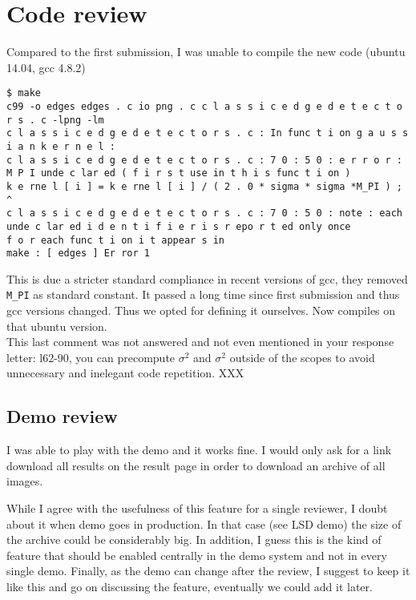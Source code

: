 \documentclass[a4paper,10pt]{report}
\begin{document}
\section{Code review}

\que Compared to the first submission, I was unable to compile the new code (ubuntu 14.04, gcc 4.8.2)
\begin{verbatim}
$ make
c99 -o edges edges . c io png . c c l a s s i c e d g e d e t e c t o r s . c -lpng -lm
c l a s s i c e d g e d e t e c t o r s . c : In func t i on g a u s s i a n k e r n e l :
c l a s s i c e d g e d e t e c t o r s . c : 7 0 : 5 0 : e r r o r : M P I unde c lar ed ( f i r s t use in t h i s func t i on )
k e rne l [ i ] = k e rne l [ i ] / ( 2 . 0 * sigma * sigma *M_PI ) ;
^
c l a s s i c e d g e d e t e c t o r s . c : 7 0 : 5 0 : note : each unde c lar ed i d e n t i f i e r i s r epo r t ed only once
f o r each func t i on i t appear s in
make : [ edges ] Er ror 1
\end{verbatim}

\ans This is due a stricter standard compliance in recent versions of gcc, they removed \verb+M_PI+ as standard constant. It passed a long time since first submission and thus gcc versions changed. Thus we opted for defining it ourselves. Now compiles on that ubuntu version.\\

\que This last comment was not answered and not even mentioned in your response letter:
l62-90, you can precompute $\sigma^2$ and $\sigma^2$ outside of the scopes to avoid unnecessary and inelegant code
repetition.
\ans  XXX\\

\subsection{ Demo review}
\que I was able to play with the demo and it works fine. I would only ask for a link download all results on the
result page in order to download an archive of all images.

\ans While I agree with the usefulness of this feature for a single reviewer, I doubt about it when demo goes in production. In that case (see LSD demo) the size of the archive could be considerably big. In addition, I guess this is the kind of feature that should be enabled centrally in the demo system and not in every single demo. Finally, as the demo can change after the review, I suggest to keep it like this and go on discussing the feature, eventually we could add it later.\\
\end{document}
